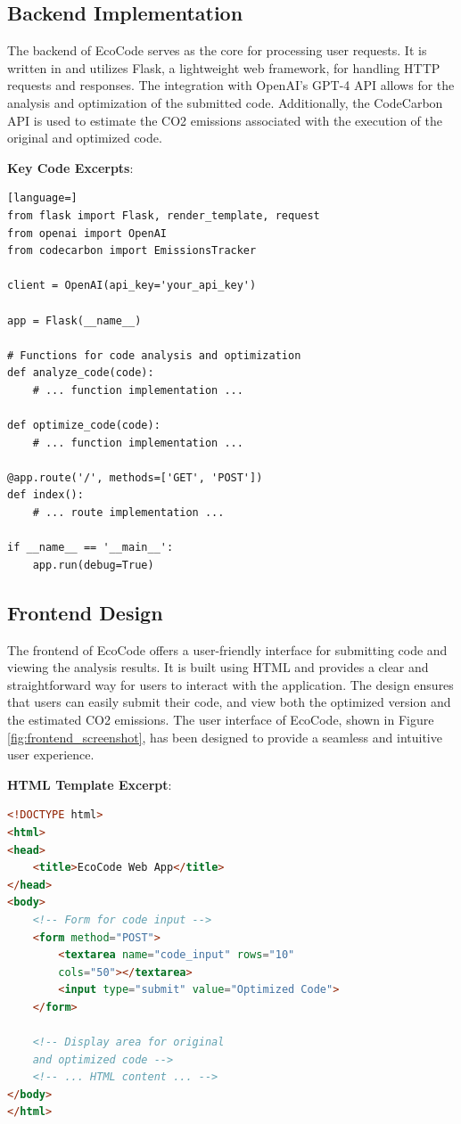 \documentclass[conference,compsoc]{IEEEtran}
\begin{document}
\subsection{Backend Implementation}
The backend of EcoCode serves as the core for processing user requests. It is written in  and utilizes Flask, a lightweight web framework, for handling HTTP requests and responses. The integration with OpenAI's GPT-4 API allows for the analysis and optimization of the submitted  code. Additionally, the CodeCarbon API is used to estimate the CO2 emissions associated with the execution of the original and optimized code.

\textbf{Key Code Excerpts}:
\begin{lstlisting}[language=]
from flask import Flask, render_template, request
from openai import OpenAI
from codecarbon import EmissionsTracker

client = OpenAI(api_key='your_api_key')

app = Flask(__name__)

# Functions for code analysis and optimization
def analyze_code(code):
    # ... function implementation ...

def optimize_code(code):
    # ... function implementation ...

@app.route('/', methods=['GET', 'POST'])
def index():
    # ... route implementation ...

if __name__ == '__main__':
    app.run(debug=True)
\end{lstlisting}

\subsection{Frontend Design}
The frontend of EcoCode offers a user-friendly interface for submitting  code and viewing the analysis results. It is built using HTML and provides a clear and straightforward way for users to interact with the application. The design ensures that users can easily submit their code, and view both the optimized version and the estimated CO2 emissions.
The user interface of EcoCode, shown in Figure \ref{fig:frontend_screenshot}, has been designed to provide a seamless and intuitive user experience.

\textbf{HTML Template Excerpt}:
\begin{lstlisting}[language=HTML]
<!DOCTYPE html>
<html>
<head>
    <title>EcoCode Web App</title>
</head>
<body>
    <!-- Form for code input -->
    <form method="POST">
        <textarea name="code_input" rows="10" 
        cols="50"></textarea>
        <input type="submit" value="Optimized Code">
    </form>

    <!-- Display area for original 
    and optimized code -->
    <!-- ... HTML content ... -->
</body>
</html>
\end{lstlisting}
\end{document}
